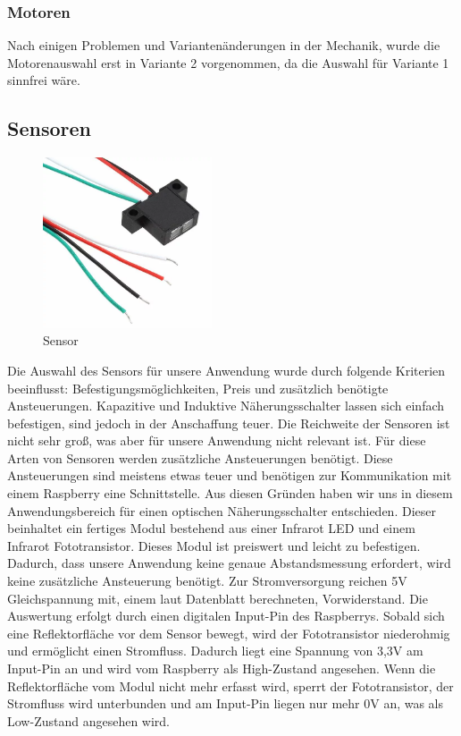 \subsubsection{Motoren}
Nach einigen Problemen und Variantenänderungen in der Mechanik, wurde die Motorenauswahl erst in Variante 2 vorgenommen, da die Auswahl für Variante 1 sinnfrei wäre.

\subsection{Sensoren}
\begin{figure}[H] 
\begin{center}

\includegraphics[width=5cm]{Bilder/Bauteile/Sensor}
\caption{Sensor}
\label{Sensor}

\end{center}
\end{figure}
Die Auswahl des Sensors für unsere Anwendung wurde durch folgende Kriterien beeinflusst: Befestigungsmöglichkeiten, Preis und zusätzlich benötigte Ansteuerungen.
Kapazitive und Induktive Näherungsschalter lassen sich einfach befestigen, sind jedoch in der Anschaffung teuer. Die Reichweite der Sensoren ist nicht sehr groß, was aber für unsere Anwendung nicht relevant ist. Für diese Arten von Sensoren werden zusätzliche Ansteuerungen benötigt. Diese Ansteuerungen sind meistens etwas teuer und benötigen zur Kommunikation mit einem Raspberry eine Schnittstelle.
Aus diesen Gründen haben wir uns in diesem Anwendungsbereich für einen optischen Näherungsschalter entschieden. Dieser beinhaltet ein fertiges Modul bestehend aus einer Infrarot LED und einem Infrarot Fototransistor. Dieses Modul ist preiswert und leicht zu befestigen. Dadurch, dass unsere Anwendung keine genaue Abstandsmessung erfordert, wird keine zusätzliche Ansteuerung benötigt. Zur Stromversorgung reichen 5V Gleichspannung mit, einem laut Datenblatt berechneten, Vorwiderstand. Die Auswertung erfolgt durch einen digitalen Input-Pin des Raspberrys. Sobald sich eine Reflektorfläche vor dem Sensor bewegt, wird der Fototransistor niederohmig und ermöglicht einen Stromfluss. Dadurch liegt eine Spannung von 3,3V am Input-Pin an und wird vom Raspberry als High-Zustand angesehen. Wenn die Reflektorfläche vom Modul nicht mehr erfasst wird, sperrt der Fototransistor, der Stromfluss wird unterbunden und am Input-Pin liegen nur mehr 0V an, was als Low-Zustand angesehen wird. \\


